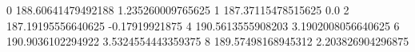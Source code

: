 0 188.60641479492188 1.235260009765625
1 187.37115478515625 0.0
2 187.19195556640625 -0.17919921875
4 190.5613555908203 3.1902008056640625
6 190.9036102294922 3.5324554443359375
8 189.57498168945312 2.203826904296875
